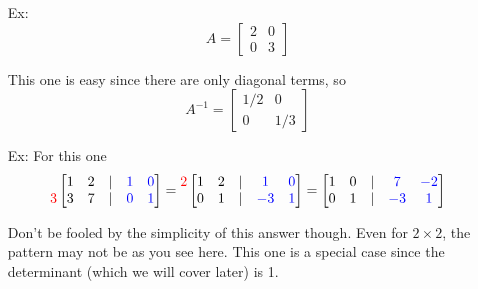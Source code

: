\documentclass[reqno]{amsart}
\theoremstyle{definition}
\begin{document}
\begin{enumerate}

\item[Ex:  ]  
%
\begin{equation*}
A = 
\begin{bmatrix}
2 & 0\\
0 & 3
\end{bmatrix}
\end{equation*}

This one is easy since there are only diagonal terms, so
%
\begin{equation*}
A^{-1} = 
\begin{bmatrix}
1/2 & 0\\
0 & 1/3
\end{bmatrix}
\end{equation*}

\item[Ex:  ]  For this one
%
\begin{equation*}
\begin{matrix}
\\
{\color{red} 3}
\end{matrix}\begin{bmatrix}
1 & 2 & | & {\color{blue}1} & {\color{blue}0}\\
3 & 7 & | & {\color{blue}0} & {\color{blue}1}
\end{bmatrix} = \begin{matrix}
{\color{red} 2}\\
\\
\end{matrix}\begin{bmatrix}
1 & 2 & | & {\color{blue}1} & {\color{blue}0}\\
0 & 1 & | & {\color{blue}-3} & {\color{blue}1}
\end{bmatrix} = \begin{bmatrix}
1 & 0 & | & {\color{blue}7} & {\color{blue}-2}\\
0 & 1 & | & {\color{blue}-3} & {\color{blue}1}
\end{bmatrix}
\end{equation*}

Don't be fooled by the simplicity of this answer though.  Even for $2 \times 2$, the pattern may not be as you
see here.  This one is a special case since the determinant (which we will cover later) is 1.


\end{enumerate}
\end{document}
